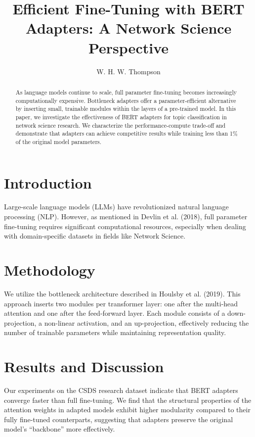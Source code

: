 \documentclass[
  letterpaper,
  DIV=11,
  numbers=noendperiod]{scrartcl}
\title{Efficient Fine-Tuning with BERT Adapters: A Network Science
Perspective}
\author{W. H. W. Thompson}
\date{}
\begin{document}
\maketitle
\begin{abstract}
As language models continue to scale, full parameter fine-tuning becomes
increasingly computationally expensive. Bottleneck adapters offer a
parameter-efficient alternative by inserting small, trainable modules
within the layers of a pre-trained model. In this paper, we investigate
the effectiveness of BERT adapters for topic classification in network
science research. We characterize the performance-compute trade-off and
demonstrate that adapters can achieve competitive results while training
less than 1\% of the original model parameters.
\end{abstract}


\section{Introduction}\label{introduction}

Large-scale language models (LLMs) have revolutionized natural language
processing (NLP). However, as mentioned in Devlin et al. (2018), full
parameter fine-tuning requires significant computational resources,
especially when dealing with domain-specific datasets in fields like
Network Science.

\section{Methodology}\label{methodology}

We utilize the bottleneck architecture described in Houlsby et al.
(2019). This approach inserts two modules per transformer layer: one
after the multi-head attention and one after the feed-forward layer.
Each module consists of a down-projection, a non-linear activation, and
an up-projection, effectively reducing the number of trainable
parameters while maintaining representation quality.

\section{Results and Discussion}\label{results-and-discussion}

Our experiments on the CSDS research dataset indicate that BERT adapters
converge faster than full fine-tuning. We find that the structural
properties of the attention weights in adapted models exhibit higher
modularity compared to their fully fine-tuned counterparts, suggesting
that adapters preserve the original model's ``backbone'' more
effectively.
\end{document}
